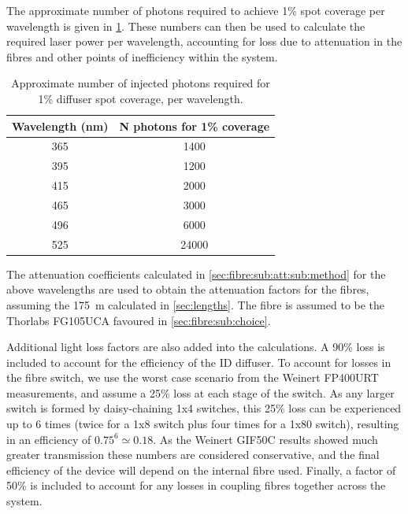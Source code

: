 \documentclass[a4paper,11pt]{article}
\begin{document}
The approximate number of photons required to achieve 1\% spot coverage per wavelength is given in \cref{tab:coverage}. These numbers can then be used to calculate the required laser power per wavelength, accounting for loss due to attenuation in the fibres and other points of inefficiency within the system.
\begin{table}[h]
\centering
\begin{tabular}{cc}
\toprule
Wavelength (nm) & N photons for 1\% coverage \\ \midrule
365 & 1400 \\
395 & 1200 \\
415 & 2000 \\
465 & 3000 \\
496 & 6000 \\
525 & 24000\\ \bottomrule
\end{tabular}
\caption{Approximate number of injected photons required for 1\% diffuser spot coverage, per wavelength.}\label{tab:coverage}
\end{table}
The attenuation coefficients calculated in \cref{sec:fibre:sub:att:sub:method} for the above wavelengths are used to obtain the attenuation factors for the fibres, assuming the 175~m calculated in \cref{sec:lengths}. The fibre is assumed to be the Thorlabs FG105UCA favoured in \cref{sec:fibre:sub:choice}.

Additional light loss factors are also added into the calculations. A 90\% loss is included to account for the efficiency of the ID diffuser. To account for losses in the fibre switch, we use the worst case scenario from the Weinert FP400URT measurements, and assume a 25\% loss at each stage of the switch. As any larger switch is formed by daisy-chaining 1x4 switches, this 25\% loss can be experienced up to 6 times (twice for a 1x8 switch plus four times for a 1x80 switch), resulting in an efficiency of $0.75^6 \simeq 0.18$. As the Weinert GIF50C results showed much greater transmission these numbers are considered conservative, and the final efficiency of the device will depend on the internal fibre used. Finally, a factor of 50\% is included to account for any losses in coupling fibres together across the system.
\end{document}
